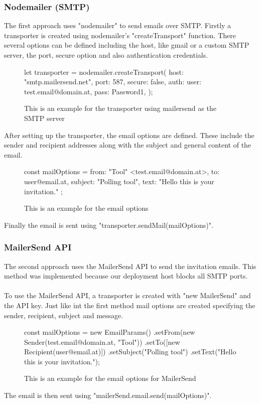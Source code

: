 \documentclass[a4paper,12pt]{report}
\begin{document}
\subsubsection{Nodemailer (SMTP)}
The first approach uses "nodemailer" to send emails over SMTP. Firstly a transporter is created using nodemailer's "createTransport" function. There several options can be defined including the host, like gmail or a custom SMTP server, the port, secure option and also authentication credentials. 
\begin{figure}[H]
	\begin{code}
		let transporter = nodemailer.createTransport({
			host: "smtp.mailersend.net",
			port: 587,
			secure: false,
			auth: {
				user: test.email@domain.at,
				pass: Password1,
			}
		});
	\end{code}
	\caption{This is an example for the transporter using mailersend as the SMTP server}
	\label{fig:example-transporter}
\end{figure}
After setting up the transporter, the email options are defined. These include the sender and recipient addresses along with the subject and general content of the email.
\begin{figure}[H]
	\begin{code}
		const mailOptions = {
			from: "Tool" <test.email@domain.at>,
			to: user@email.at,
			subject: "Polling tool",
			text: "Hello this is your invitation."
		};
	\end{code}
	\caption{This is an example for the email options}
	\label{fig:example-mail-options-smtp}
\end{figure}
Finally the email is sent using "transporter.sendMail(mailOptions)".
\subsubsection{MailerSend API}
The second approach uses the MailerSend API to send the invitation emails. This method was implemented because our deployment host blocks all SMTP ports.\\\\
To use the MailerSend API, a transporter is created with "new MailerSend" and the API key. Just like int the first method mail options are created specifying the sender, recipient, subject and message.
\begin{figure}[H]
	\begin{code}
		const mailOptions = new EmailParams()
		.setFrom(new Sender(test.email@domain.at, "Tool"))
		.setTo([new Recipient(user@email.at)])
		.setSubject("Polling tool")
		.setText("Hello this is your invitation.");
	\end{code}
	\caption{This is an example for the email options for MailerSend}
	\label{fig:example-mail-options-mailersend}
\end{figure}
The email is then sent using "mailerSend.email.send(mailOptions)".
\end{document}
